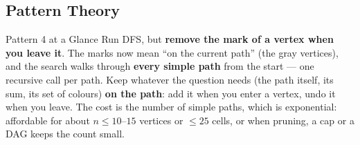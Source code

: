 \subsection{Pattern Theory}
\label{ssec:ch2-p4-theory}

\begin{patternbox}{Pattern 4 at a Glance}
Run DFS, but \textbf{remove the mark of a vertex when you leave it}. The marks now mean ``on the current path'' (the gray vertices), and the search walks through \textbf{every simple path} from the start --- one recursive call per path. Keep whatever the question needs (the path itself, its sum, its set of colours) \textbf{on the path}: add it when you enter a vertex, undo it when you leave. The cost is the number of simple paths, which is exponential: affordable for about $n \le 10$--$15$ vertices or $\le 25$ cells, or when pruning, a cap or a DAG keeps the count small.


\end{patternbox}
